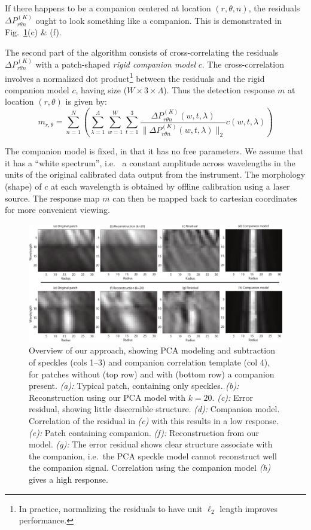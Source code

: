 \documentclass[12pt,pdftex,preprint]{aastex}
\newcommand{\fig}[1]{Fig.\ \ref{fig:#1}}
\begin{document}
If there happens to be a companion centered at location $(r, \theta,
n)$, the residuals $\Delta P^{(K)}_{r \theta n}$ ought to look something
like a companion. This is demonstrated in \fig{patch_recon}(c) \& (f).

The second part of the algorithm consists of cross-correlating the residuals $\Delta P^{(K)}_{r \theta n}$ with a
patch-shaped \emph{rigid companion model} $c$.  The cross-correlation
involves a normalized dot product\footnote{In practice, normalizing the
residuals to have unit $\ell_2$ length improves performance.} between the residuals and the
rigid companion model $c$, having size ($W \times 3 \times \Lambda$). Thus the
detection response $m$ at location $(r,\theta)$ is given by:
\begin{equation}
m_{r,\theta} = \sum_{n=1}^N ( \sum^\Lambda_{\lambda=1}
\sum_{w=1}^W \sum_{t=1}^3 \frac{\Delta
P^{(K)}_{r \theta n}(w,t,\lambda)}{\|\Delta
P^{(K)}_{r \theta n}(w,t,\lambda) \|_2} c(w,t,\lambda) ) 
\end{equation}

The companion model is fixed, in that it has no free parameters. We
assume that it has a ``white spectrum'', i.e.~ a
constant amplitude across wavelengths in the units of the original
calibrated data output from the instrument. The morphology (shape) of
$c$ at each wavelength is obtained by offline calibration using a
laser source. The response map $m$ can then be mapped back to cartesian coordinates
for more convenient viewing.

\begin{figure}[h!]
\begin{center}
\includegraphics[width=6.5in]{figs/patch_reconstructions.pdf}
\end{center}
\vspace{-7mm}
\caption{Overview of our approach, showing PCA modeling and
  subtraction of speckles (cols 1--3) and companion correlation
  template (col 4), for patches without (top row) and with (bottom
  row) a companion present. {\em (a):} Typical
 patch, containing only speckles. {\em (b):} Reconstruction
 using our PCA model with $k=20$. {\em (c):} Error
 residual, showing little discernible structure. {\em (d):}
 Companion model. Correlation of the residual in {\em (c)} with this
 results in a low response.  {\em (e):} Patch
 containing companion. {\em (f):} Reconstruction from our
 model. {\em (g):} The error residual shows clear structure
 associate with the companion, i.e.~the PCA speckle model cannot
 reconstruct well the companion signal. Correlation using the
 companion model {\em (h)} gives a high response.}
\label{fig:patch_recon}
\end{figure}
\end{document}

